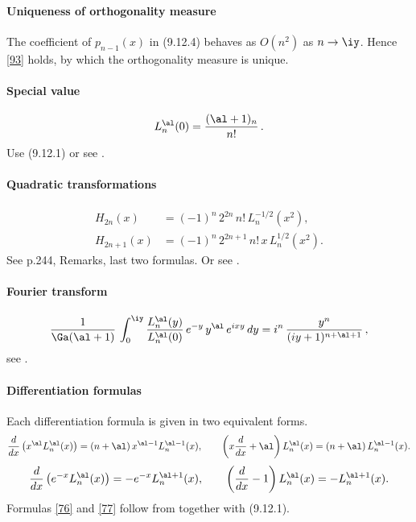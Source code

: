 \documentclass[envcountchap,graybox]{svmono}
\newcounter{rom}
\begin{document}
\paragraph{Uniqueness of orthogonality measure}
The coefficient of $p_{n-1}(x)$ in (9.12.4) behaves as $O(n^2)$ as $n\to\iy$.
Hence \eqref{93} holds, by which the orthogonality measure is unique.
%
\paragraph{Special value}
\begin{equation}
L_n^{\al}(0)=\frac{(\al+1)_n}{n!}\,.
\label{53}
\end{equation}
Use (9.12.1) or see .
%
\paragraph{Quadratic transformations}
\begin{align}
H_{2n}(x)&=(-1)^n\,2^{2n}\,n!\,L_n^{-1/2}(x^2),
\label{54}\\
H_{2n+1}(x)&=(-1)^n\,2^{2n+1}\,n!\,x\,L_n^{1/2}(x^2).
\label{55}
\end{align}
See p.244, Remarks, last two formulas.
Or see .
%
\paragraph{Fourier transform}
\begin{equation}
\frac1{\Ga(\al+1)}\,\int_0^\iy \frac{L_n^\al(y)}{L_n^\al(0)}\,
e^{-y}\,y^\al\,e^{ixy}\,dy=
i^n\,\frac{y^n}{(iy+1)^{n+\al+1}}\,,
\label{14}
\end{equation}
see .
%
\paragraph{Differentiation formulas}
Each differentiation formula is given in two equivalent forms.
\begin{equation}
\frac d{dx}\left(x^\al L_n^\al(x)\right)=
(n+\al)\,x^{\al-1} L_n^{\al-1}(x),\qquad
\left(x\frac d{dx}+\al\right)L_n^\al(x)=
(n+\al)\,L_n^{\al-1}(x).
\label{76}
\end{equation}
%
\begin{equation}
\frac d{dx}\left(e^{-x} L_n^\al(x)\right)=
-e^{-x} L_n^{\al+1}(x),\qquad
\left(\frac d{dx}-1\right)L_n^\al(x)=
-L_n^{\al+1}(x).
\label{77}
\end{equation}
%
Formulas \eqref{76} and \eqref{77} follow from
together with (9.12.1). 
%
\end{document}
